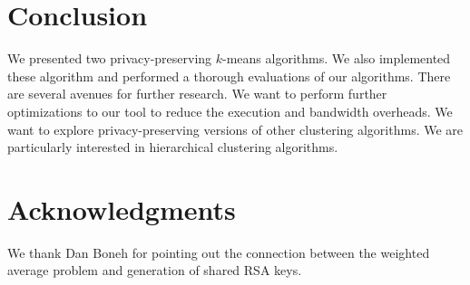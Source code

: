 \section{Conclusion}

We presented two privacy-preserving $k$-means algorithms. We also
implemented these algorithm and performed a thorough evaluations of
our algorithms. There are several avenues for further research. We
want to perform further optimizations to our tool to reduce the
execution and bandwidth overheads. We want to explore
privacy-preserving versions of other clustering algorithms. We are
particularly interested in hierarchical clustering algorithms.

\section*{Acknowledgments}

We thank Dan Boneh for pointing out the connection between the
weighted average problem and generation of shared RSA keys. 
